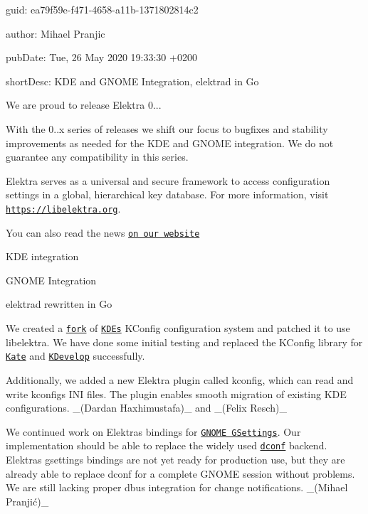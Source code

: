 
\begin{DoxyItemize}
\item guid\+: ea79f59e-\/f471-\/4658-\/a11b-\/1371802814c2
\item author\+: Mihael Pranjic
\item pub\+Date\+: Tue, 26 May 2020 19\+:33\+:30 +0200
\item short\+Desc\+: K\+DE and G\+N\+O\+ME Integration, {\ttfamily elektrad} in Go
\end{DoxyItemize}

We are proud to release Elektra 0...

With the 0..\+x series of releases we shift our focus to bugfixes and stability improvements as needed for the K\+DE and G\+N\+O\+ME integration. We do not guarantee any compatibility in this series.

Elektra serves as a universal and secure framework to access configuration settings in a global, hierarchical key database. For more information, visit \href{https://libelektra.org}{\tt https\+://libelektra.\+org}.

You can also read the news \href{https://www.libelektra.org/news/0.9.2-release}{\tt on our website}


\begin{DoxyItemize}
\item K\+DE integration
\item G\+N\+O\+ME Integration
\item {\ttfamily elektrad} rewritten in Go
\end{DoxyItemize}

We created a \href{https://github.com/ElektraInitiative/kconfig}{\tt fork} of \href{https://kde.org/}{\tt K\+DE\textquotesingle{}s} {\ttfamily K\+Config} configuration system and patched it to use libelektra. We have done some initial testing and replaced the {\ttfamily K\+Config} library for \href{https://kate-editor.org/}{\tt Kate} and \href{https://www.kdevelop.org/}{\tt K\+Develop} successfully.

Additionally, we added a new Elektra plugin called {\ttfamily kconfig}, which can read and write kconfig\textquotesingle{}s I\+NI files. The plugin enables smooth migration of existing K\+DE configurations. \+\_\+(\+Dardan Haxhimustafa)\+\_\+ and \+\_\+(\+Felix Resch)\+\_\+

We continued work on Elektra\textquotesingle{}s bindings for \href{https://developer.gnome.org/gio/2.26/GSettingsBackend.html}{\tt G\+N\+O\+ME G\+Settings}. Our implementation should be able to replace the widely used \href{https://wiki.gnome.org/Projects/dconf}{\tt dconf} backend. Elektra\textquotesingle{}s {\ttfamily gsettings} bindings are not yet ready for production use, but they are already able to replace {\ttfamily dconf} for a complete G\+N\+O\+ME session without problems. We are still lacking proper dbus integration for change notifications. \+\_\+(Mihael Pranjić)\+\_\+

